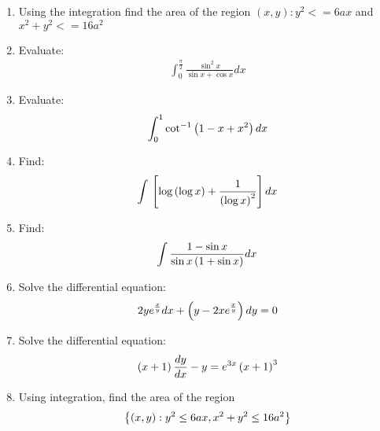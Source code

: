 \begin{enumerate}
    \item Using the integration find the area of the region
          $ (x,y):y^{2}<=6ax$ and $x^{2}+y^{2}<=16a^{2}$
    \item Evaluate: 
    \begin{align*}
        \int_0^\frac{\pi}{2} \frac{\sin^{2}x}{\sin x + \cos x} dx
    \end{align*}
    \item Evaluate:
    \begin{align*}
        \int_0^1 \cot^{-1}\left(1 - x + x^{2}\right) dx
    \end{align*}
    \item Find: 
    \begin{align*}
        \int {}\left[\log\left(\log x\right) + \frac{1}{\left(\log x\right)^{2}}\right] dx
    \end{align*}
    \item Find: 
    \begin{align*}
        \int \frac{1 - \sin x}{\sin x \left(1 + \sin x\right)}dx
    \end{align*}
    \item Solve the differential equation: 
    \begin{align*}
        2y e^{\frac{x}{y}}dx + \left(y - 2xe^{\frac{x}{y}}\right)dy = 0
    \end{align*}
    \item Solve the differential equation: 
    \begin{align*}
        \left(x + 1\right) \frac{dy}{dx} - y = e^{3x}\left(x + 1\right)^{3}
    \end{align*}
    \item Using integration, find the area of the region 
    \begin{align*}
        \left\{\left(x,y\right) : y^{2} \leq 6ax, x^{2} + y^{2} \leq 16a^{2}\right\}
    \end{align*}
\end{enumerate}

